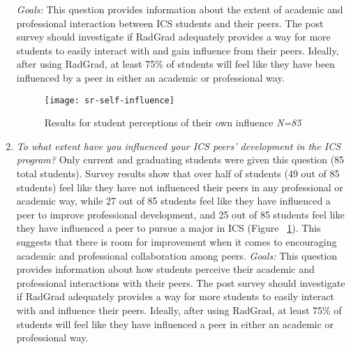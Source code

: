 \begin{enumerate}
\textit{Goals:} This question provides information about the extent of academic and professional interaction between ICS students and their peers. The post survey should investigate if RadGrad adequately provides a way for more students to easily interact with and gain influence from their peers.  Ideally, after using RadGrad, at least 75\% of students will feel like they have been influenced by a peer in either an academic or professional way. 

\begin{figure}[h]
\centering
\texttt{[image: sr-self-influence]}
\caption{Results for student perceptions of their own influence \textit{N=85}}
\label{self-influence}
\end{figure}
\item \textit{To what extent have you influenced your ICS peers’ development in the ICS program?}
Only current and graduating students were given this question (85 total students). Survey results show that over half of students (49 out of 85 students) feel like they have not influenced their peers in any professional or academic way, while 27 out of 85 students feel like they have influenced a peer to improve professional development, and 25 out of 85 students feel like they have influenced a peer to pursue a major in ICS (Figure ~\ref{self-influence}). This suggests that there is room for improvement when it comes to encouraging academic and professional collaboration among peers.
\textit{Goals:} This question provides information about how students perceive their academic and professional interactions with their peers. The post survey should investigate if RadGrad adequately provides a way for more students to easily interact with and influence their peers.  Ideally, after using RadGrad, at least 75\% of students will feel like they have influenced a peer in either an academic or professional way. 

\end{enumerate}

